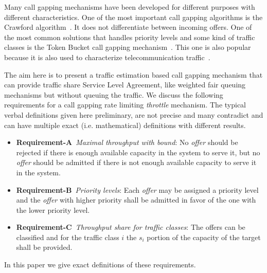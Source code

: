 \documentclass[conference]{IEEEtran}
\newcommand{\comment}[1]{}
\newcommand{\reqA}{\textbf{Requirement-A}}
\newcommand{\reqB}{\textbf{Requirement-B}}
\newcommand{\reqC}{\textbf{Requirement-C}}
\begin{document}
Many call gapping mechanisms have been developed for different
purposes with different characteristics. One of the most important
call gapping algorithms is the Crawford algorithm~\cite{CRAWFORD}.
It does not differentiate between incoming offers. One of the most
common solutions that handles priority levels and some kind of
traffic classes is the Token Bucket call gapping
mechanism~\cite{H.248.11}. This one is also popular because it is
also used to characterize telecommunication traffic~\cite{TBCHAR}.

\comment{(This work is motivated by the problem of providing
resource sharing in telecommunication networks with call gapping in
case of overload. The problem arises when concurring applications
use the same limited resource in the system i.e. processor capacity,
memory. The problem to be solved is similar to the ones solved by
Fair Queuing, Weighted Fair Queuing, General Processor
Sharing~\cite{WFQ,GPS} but the requirements and the environment is
different. The fundamental difference is that there are no queues
allowed in our case and it is desired to keep some kind of Token
Bucket property.)}

The aim here is to present a traffic estimation based call gapping
mechanism that can provide traffic share Service Level Agreement,
like weighted fair queuing mechanisms but without queuing the
traffic. We discuss the following requirements for a call gapping
rate limiting \textit{throttle} mechanism. The typical verbal
definitions given here preliminary, are not precise and many
contradict and can have multiple exact (i.e. mathematical)
definitions with different results\comment{(they are polysemantic)}.

\begin{itemize}
 \item \reqA\label{req-max-throughput}\ \textit{Maximal
throughput with bound}: No \textit{offer} should be rejected if
there is enough available capacity in the system to serve it, but no
\textit{offer} should be admitted if there  is not enough available
capacity to serve it in the system.
 \item \reqB\label{req-priority-calss}\ \textit{Priority
levels}: Each \textit{offer} may be assigned a priority level and
the \textit{offer} with higher priority shall be admitted in favor
of the one with the lower priority level.
 \item \reqC\label{req-throughput-share}\
\textit{Throughput share for traffic classes}: The offers can be
classified and for the traffic class $i$ the $s_i$ portion of the
capacity of the target shall be provided.
\end{itemize}
In this paper we give exact definitions of these requirements.
\end{document}
